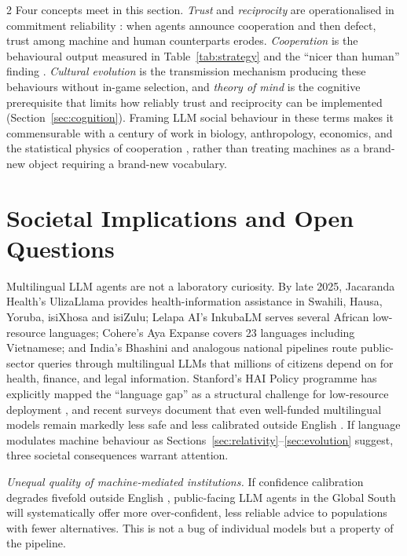 \documentclass[openacc]{rsproca_new}
\begin{document}
\begin{multicols}{2}
Four concepts meet in this section. \emph{Trust} and \emph{reciprocity} are operationalised in commitment reliability \cite{xie2026m3bench}: when agents announce cooperation and then defect, trust among machine and human counterparts erodes. \emph{Cooperation} is the behavioural output measured in Table~\ref{tab:strategy} and the ``nicer than human'' finding \cite{fontana2024nicer}. \emph{Cultural evolution} \cite{boyd1985culture, henrich2016secret} is the transmission mechanism producing these behaviours without in-game selection, and \emph{theory of mind} is the cognitive prerequisite that limits how reliably trust and reciprocity can be implemented (Section~\ref{sec:cognition}). Framing LLM social behaviour in these terms makes it commensurable with a century of work in biology, anthropology, economics, and the statistical physics of cooperation \cite{perc2017statistical}, rather than treating machines as a brand-new object requiring a brand-new vocabulary.

\section{Societal Implications and Open Questions}
\label{sec:society}

Multilingual LLM agents are not a laboratory curiosity. By late 2025, Jacaranda Health's UlizaLlama provides health-information assistance in Swahili, Hausa, Yoruba, isiXhosa and isiZulu; Lelapa AI's InkubaLM serves several African low-resource languages; Cohere's Aya Expanse covers 23 languages including Vietnamese; and India's Bhashini and analogous national pipelines route public-sector queries through multilingual LLMs that millions of citizens depend on for health, finance, and legal information. Stanford's HAI Policy programme has explicitly mapped the ``language gap'' as a structural challenge for low-resource deployment \cite{stanfordhai2024languagegap}, and recent surveys document that even well-funded multilingual models remain markedly less safe and less calibrated outside English \cite{yong2025multilingualsafety, m-alert2025, wang2024evaluating}. If language modulates machine behaviour as Sections~\ref{sec:relativity}--\ref{sec:evolution} suggest, three societal consequences warrant attention.

\emph{Unequal quality of machine-mediated institutions.} If confidence calibration degrades fivefold outside English \cite{zhou2025beyond}, public-facing LLM agents in the Global South will systematically offer more over-confident, less reliable advice to populations with fewer alternatives. This is not a bug of individual models but a property of the pipeline.


\end{multicols}
\end{document}
